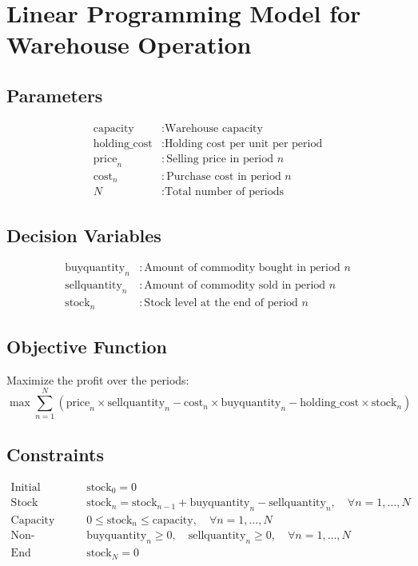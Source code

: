 \documentclass{article}
\begin{document}
\section*{Linear Programming Model for Warehouse Operation}

\subsection*{Parameters}
\begin{align*}
    \text{capacity} &: \text{Warehouse capacity} \\
    \text{holding\_cost} &: \text{Holding cost per unit per period} \\
    \text{price}_n &: \text{Selling price in period } n \\
    \text{cost}_n &: \text{Purchase cost in period } n \\
    N &: \text{Total number of periods}
\end{align*}

\subsection*{Decision Variables}
\begin{align*}
    \text{buyquantity}_n &: \text{Amount of commodity bought in period } n \\
    \text{sellquantity}_n &: \text{Amount of commodity sold in period } n \\
    \text{stock}_n &: \text{Stock level at the end of period } n
\end{align*}

\subsection*{Objective Function}
Maximize the profit over the periods:
\[
\max \sum_{n=1}^{N} \left( \text{price}_n \times \text{sellquantity}_n - \text{cost}_n \times \text{buyquantity}_n - \text{holding\_cost} \times \text{stock}_n \right)
\]

\subsection*{Constraints}
\begin{align*}
    \text{Initial Condition:} & \quad \text{stock}_0 = 0 \\
    \text{Stock Balance:} & \quad \text{stock}_n = \text{stock}_{n-1} + \text{buyquantity}_n - \text{sellquantity}_n, \quad \forall n = 1, \ldots, N \\
    \text{Capacity Constraint:} & \quad 0 \leq \text{stock}_n \leq \text{capacity}, \quad \forall n = 1, \ldots, N \\
    \text{Non-negativity:} & \quad \text{buyquantity}_n \geq 0, \quad \text{sellquantity}_n \geq 0, \quad \forall n = 1, \ldots, N \\
    \text{End Condition:} & \quad \text{stock}_N = 0
\end{align*}
\end{document}

